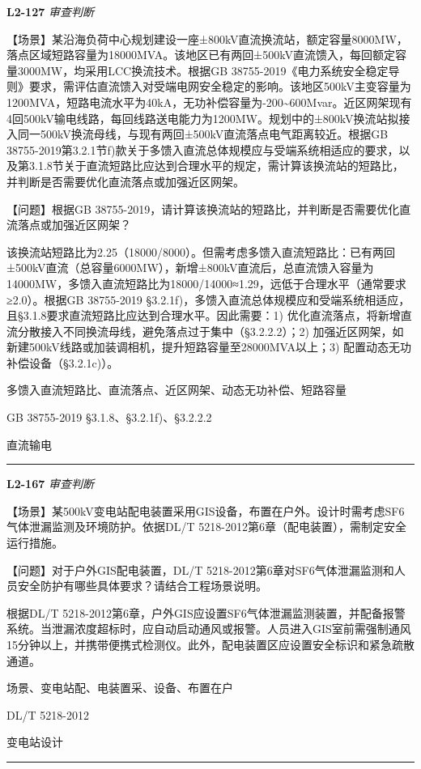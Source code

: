 \documentclass[12pt,a4paper]{ctexart}
\begin{document}
\noindent\textbf{L2-127} \hfill \textit{审查判断}
\begin{description}[leftmargin=1.5em,style=nextline,font=\normalfont]
  \item[Q:] 【场景】某沿海负荷中心规划建设一座±800kV直流换流站，额定容量8000MW，落点区域短路容量为18000MVA。该地区已有两回±500kV直流馈入，每回额定容量3000MW，均采用LCC换流技术。根据GB 38755-2019《电力系统安全稳定导则》要求，需评估直流馈入对受端电网安全稳定的影响。该地区500kV主变容量为1200MVA，短路电流水平为40kA，无功补偿容量为-200\textasciitilde{}600Mvar。近区网架现有4回500kV输电线路，每回线路送电能力为1200MW。规划中的±800kV换流站拟接入同一500kV换流母线，与现有两回±500kV直流落点电气距离较近。根据GB 38755-2019第3.2.1节f)款关于多馈入直流总体规模应与受端系统相适应的要求，以及第3.1.8节关于直流短路比应达到合理水平的规定，需计算该换流站的短路比，并判断是否需要优化直流落点或加强近区网架。

【问题】根据GB 38755-2019，请计算该换流站的短路比，并判断是否需要优化直流落点或加强近区网架？
  \item[A:] 该换流站短路比为2.25（18000/8000）。但需考虑多馈入直流短路比：已有两回±500kV直流（总容量6000MW），新增±800kV直流后，总直流馈入容量为14000MW，多馈入直流短路比为18000/14000≈1.29，远低于合理水平（通常要求≥2.0）。根据GB 38755-2019 §3.2.1f)，多馈入直流总体规模应和受端系统相适应，且§3.1.8要求直流短路比应达到合理水平。因此需要：1) 优化直流落点，将新增直流分散接入不同换流母线，避免落点过于集中（§3.2.2.2）；2) 加强近区网架，如新建500kV线路或加装调相机，提升短路容量至28000MVA以上；3) 配置动态无功补偿设备（§3.2.1c)）。
  \item[KW:] 多馈入直流短路比、直流落点、近区网架、动态无功补偿、短路容量
  \item[Std:] GB 38755-2019 §3.1.8、§3.2.1f)、§3.2.2.2
  \item[Topic:] 直流输电
\end{description}
\vspace{4pt}
\hrule\vspace{6pt}

\noindent\textbf{L2-167} \hfill \textit{审查判断}
\begin{description}[leftmargin=1.5em,style=nextline,font=\normalfont]
  \item[Q:] 【场景】某500kV变电站配电装置采用GIS设备，布置在户外。设计时需考虑SF6气体泄漏监测及环境防护。依据DL/T 5218-2012第6章（配电装置），需制定安全运行措施。

【问题】对于户外GIS配电装置，DL/T 5218-2012第6章对SF6气体泄漏监测和人员安全防护有哪些具体要求？请结合工程场景说明。
  \item[A:] 根据DL/T 5218-2012第6章，户外GIS应设置SF6气体泄漏监测装置，并配备报警系统。当泄漏浓度超标时，应自动启动通风或报警。人员进入GIS室前需强制通风15分钟以上，并携带便携式检测仪。此外，配电装置区应设置安全标识和紧急疏散通道。
  \item[KW:] 场景、变电站配、电装置采、设备、布置在户
  \item[Std:] DL/T 5218-2012
  \item[Topic:] 变电站设计
\end{description}
\vspace{4pt}
\hrule\vspace{6pt}
\end{document}
